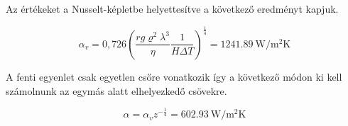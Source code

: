 \noindent Az értékeket a Nusselt-képletbe helyettesítve a következő eredményt kapjuk.

\begin{equation}
\alpha_{v}=0,726\left(\dfrac{r g \varrho^2 \lambda^3 }{\eta}\dfrac{1}{H \Delta T} \right)^\tfrac{1}{4}=\SI{1241,89}{\watt\per\meter\squared\kelvin}
\end{equation} 

\noindent A fenti egyenlet csak egyetlen csőre vonatkozik így a következő módon ki kell számolnunk az egymás alatt elhelyezkedő csövekre.

\begin{equation}
\alpha=\alpha_{v} z^{-\tfrac{1}{4}}=\SI{602,93}{\watt\per\meter\squared\kelvin}
\end{equation} 